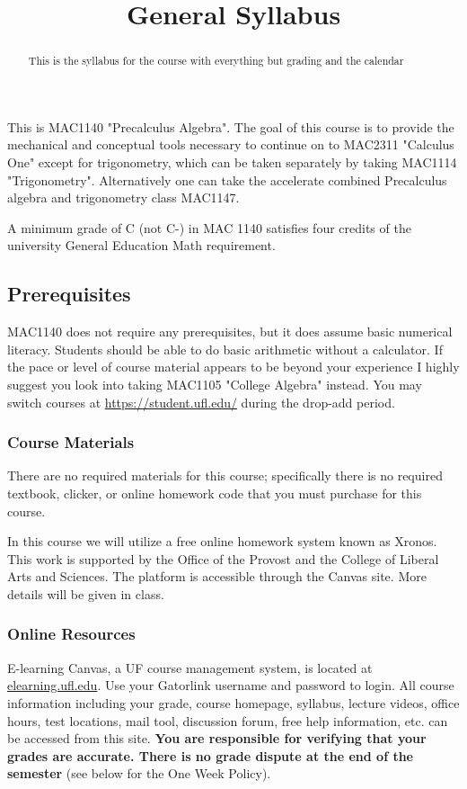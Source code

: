 \documentclass{ximera}
\title{General Syllabus}
\begin{document}
\begin{abstract}
This is the syllabus for the course with everything but grading and the calendar
\end{abstract}
\maketitle

This is MAC1140 "Precalculus Algebra". The goal of this course is to provide the mechanical and conceptual tools necessary to continue on to MAC2311 "Calculus One" except for trigonometry, which can be taken separately by taking MAC1114 "Trigonometry". Alternatively one can take the accelerate combined Precalculus algebra and trigonometry class MAC1147.

A minimum grade of C (not C-) in MAC 1140 satisfies four credits of the university General Education Math requirement.%

\subsection*{Prerequisites}
MAC1140 does not require any prerequisites, but it does assume basic numerical literacy. Students should be able to do basic arithmetic without a calculator. If the pace or level of course material appears to be beyond your experience I highly suggest you look into taking MAC1105 "College Algebra" instead. You may switch courses at \url{https://student.ufl.edu/} during the drop-add period.


\subsubsection*{Course Materials}
    There  are  no  required  materials for this course; specifically there is no required textbook, clicker, or online homework code that you must purchase for  this  course. %
    
    In this course we will utilize a free online homework system known as Xronos. This work is supported by the Office of the Provost and the College of Liberal Arts and Sciences.  The platform is accessible through the Canvas site.  More details will be given in class.


\subsubsection*{Online Resources}
    E-learning Canvas, a UF course management system, is located at \url{elearning.ufl.edu}.  Use your Gatorlink username and password to login.  All course information including your grade, course homepage, syllabus, lecture videos,  office  hours,  test locations,  mail tool,  discussion forum,  free help information,  etc. can be accessed from this site.  \textbf{You are responsible for verifying that your grades are accurate.  There is no grade dispute at the end of the semester} (see below for the One Week Policy).
\end{document}
